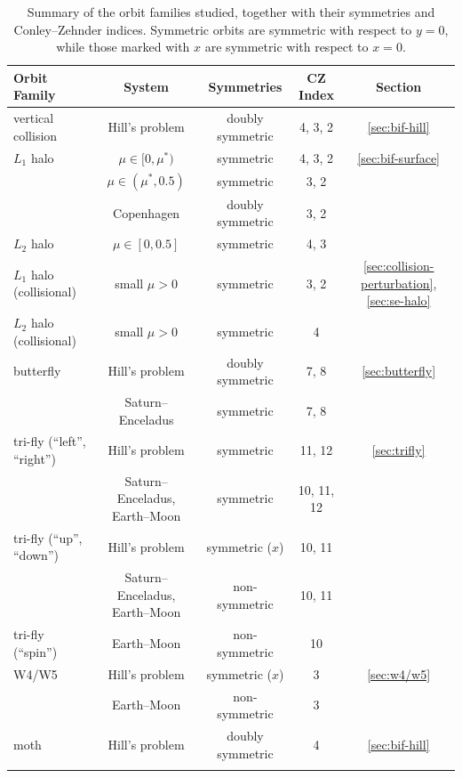 \documentclass[pdflatex,sn-mathphys-ay]{sn-jnl}%
\theoremstyle{thmstyleone}%
\theoremstyle{thmstyletwo}%
\theoremstyle{thmstylethree}%
\begin{document}
\begin{table}[!htb]
\centering
\caption{Summary of the orbit families studied, together with their symmetries and Conley--Zehnder indices. Symmetric orbits are symmetric with respect to $y=0$, while those marked with $x$ are symmetric with respect to $x=0$.}
\label{tbl:orbit-summary}
\begin{tabular}{lcccc}
\toprule
Orbit Family & System & Symmetries & CZ Index & Section \\
\midrule
vertical collision & Hill's problem & doubly symmetric & 4, 3, 2 & \ref{sec:bif-hill} \\
$L_1$ halo & $\mu\in[0,\mu^*)$ & symmetric & 4, 3, 2 & \ref{sec:bif-surface} \\
           & $\mu\in(\mu^*,0.5)$ & symmetric & 3, 2 &  \\
           & Copenhagen & doubly symmetric & 3, 2 &  \\
$L_2$ halo & $\mu\in[0,0.5]$ & symmetric &  4, 3 & \\
$L_1$ halo (collisional) & small $\mu>0$ & symmetric & 3, 2 & \ref{sec:collision-perturbation}, \ref{sec:se-halo} \\
$L_2$ halo (collisional) & small $\mu>0$ & symmetric & 4 &\\
butterfly & Hill's problem & doubly symmetric & 7, 8 & \ref{sec:butterfly} \\
          & Saturn--Enceladus  & symmetric        & 7, 8 &  \\
tri-fly (``left'', ``right'') & Hill's problem & symmetric & 11, 12  & \ref{sec:trifly} \\
                              & {\tiny Saturn--Enceladus, Earth--Moon}  & symmetric    & 10, 11, 12  &  \\
tri-fly (``up'', ``down'') & Hill's problem & symmetric ($x$) & 10, 11 &  \\ 
                           & {\tiny Saturn--Enceladus, Earth--Moon}  & non-symmetric & 10, 11 &  \\ 
tri-fly (``spin'') & Earth--Moon & non-symmetric & 10 &  \\ 
W4/W5 & Hill's problem & symmetric ($x$) & 3 & \ref{sec:w4/w5}\\
      & Earth--Moon     & non-symmetric     & 3 & \\
moth & Hill's problem & doubly symmetric & 4 & \ref{sec:bif-hill} \\
\botrule
\end{tabular}
\end{table}
\end{document}
